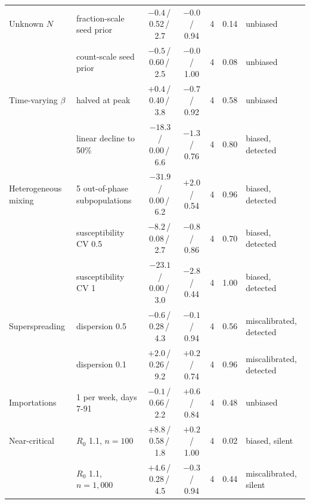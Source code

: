 \begin{tabular}{l l c c c c l}
Unknown $N$ & fraction-scale seed prior & $-0.4$\,/\,0.52\,/\,2.7 & $-0.0$\,/\,0.94 & 4 & 0.14 & unbiased \\
 & count-scale seed prior & $-0.5$\,/\,0.60\,/\,2.5 & $-0.0$\,/\,1.00 & 4 & 0.08 & unbiased \\
Time-varying $\beta$ & halved at peak & ${+}0.4$\,/\,0.40\,/\,3.8 & $-0.7$\,/\,0.92 & 4 & 0.58 & unbiased \\
 & linear decline to 50\% & $-18.3$\,/\,0.00\,/\,6.6 & $-1.3$\,/\,0.76 & 4 & 0.80 & biased, detected \\
Heterogeneous mixing & 5 out-of-phase subpopulations & $-31.9$\,/\,0.00\,/\,6.2 & ${+}2.0$\,/\,0.54 & 4 & 0.96 & biased, detected \\
 & susceptibility CV 0.5 & $-8.2$\,/\,0.08\,/\,2.7 & $-0.8$\,/\,0.86 & 4 & 0.70 & biased, detected \\
 & susceptibility CV 1 & $-23.1$\,/\,0.00\,/\,3.0 & $-2.8$\,/\,0.44 & 4 & 1.00 & biased, detected \\
Superspreading & dispersion 0.5 & $-0.6$\,/\,0.28\,/\,4.3 & $-0.1$\,/\,0.94 & 4 & 0.56 & miscalibrated, detected \\
 & dispersion 0.1 & ${+}2.0$\,/\,0.26\,/\,9.2 & ${+}0.2$\,/\,0.74 & 4 & 0.96 & miscalibrated, detected \\
Importations & 1 per week, days 7-91 & $-0.1$\,/\,0.66\,/\,2.2 & ${+}0.6$\,/\,0.84 & 4 & 0.48 & unbiased \\
Near-critical & $R_0$ 1.1, $n=100$ & ${+}8.8$\,/\,0.58\,/\,1.8 & ${+}0.2$\,/\,1.00 & 4 & 0.02 & biased, silent \\
 & $R_0$ 1.1, $n=1{,}000$ & ${+}4.6$\,/\,0.28\,/\,4.5 & $-0.3$\,/\,0.94 & 4 & 0.44 & miscalibrated, silent \\
\bottomrule
\end{tabular}
